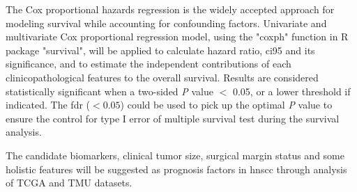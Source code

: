 \documentclass[12pt, a4paper]{article}
\begin{document}

The Cox proportional hazards regression is the widely accepted approach for modeling survival while accounting for confounding factors\cite{Magen2019}. Univariate and multivariate Cox proportional regression model\cite{Andersen1982}, using the "coxph" function in R package "survival", will be applied to calculate hazard ratio, \acrfull{ci95} and its significance, and to estimate the independent contributions of each clinicopathological features to the overall survival.
Results are considered statistically significant when a two-sided \textit{P} value $<$ 0.05, or a lower threshold if indicated.
The \acrfull{fdr} ($< 0.05$) could be used to pick up the optimal \textit{P} value to ensure the control for type I error of multiple survival test during the survival analysis.




The candidate biomarkers, clinical tumor size, surgical margin status and some holistic features will be suggested as prognosis factors in \acrshort{hnscc} through analysis of TCGA and TMU datasets.

\end{document}
